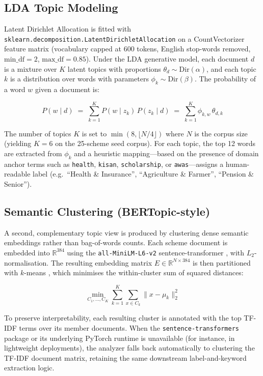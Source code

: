 \documentclass[10pt, journal, twocolumn]{IEEEtran}
\begin{document}
\subsection{LDA Topic Modeling}
Latent Dirichlet Allocation \cite{blei2003lda} is fitted with \texttt{sklearn.decomposition.LatentDirichletAllocation} on a CountVectorizer feature matrix (vocabulary capped at 600 tokens, English stop-words removed, $\text{min\_df}=2$, $\text{max\_df}=0.85$). Under the LDA generative model, each document $d$ is a mixture over $K$ latent topics with proportions $\theta_d \sim \text{Dir}(\alpha)$, and each topic $k$ is a distribution over words with parameters $\phi_k \sim \text{Dir}(\beta)$. The probability of a word $w$ given a document is:

\begin{equation}
    P(w \mid d) \;=\; \sum_{k=1}^{K} P(w \mid z_k)\, P(z_k \mid d) \;=\; \sum_{k=1}^{K} \phi_{k,w}\, \theta_{d,k}
\end{equation}

The number of topics $K$ is set to $\min(8, \lfloor N/4 \rfloor)$ where $N$ is the corpus size (yielding $K=6$ on the 25-scheme seed corpus). For each topic, the top 12 words are extracted from $\phi_k$ and a heuristic mapping---based on the presence of domain anchor terms such as \texttt{health}, \texttt{kisan}, \texttt{scholarship}, or \texttt{awas}---assigns a human-readable label (e.g.\ ``Health \& Insurance'', ``Agriculture \& Farmer'', ``Pension \& Senior'').

\subsection{Semantic Clustering (BERTopic-style)}
A second, complementary topic view is produced by clustering dense semantic embeddings rather than bag-of-words counts. Each scheme document is embedded into $\mathbb{R}^{384}$ using the \texttt{all-MiniLM-L6-v2} sentence-transformer \cite{reimers2019sbert}, with $L_2$-normalisation. The resulting embedding matrix $E \in \mathbb{R}^{N \times 384}$ is then partitioned with $k$-means \cite{macqueen1967kmeans}, which minimises the within-cluster sum of squared distances:

\begin{equation}
    \min_{C_1, \dots, C_K} \sum_{k=1}^{K} \sum_{x \in C_k} \| x - \mu_k \|_{2}^{2}
\end{equation}

To preserve interpretability, each resulting cluster is annotated with the top TF-IDF terms over its member documents. When the \texttt{sentence-transformers} package or its underlying PyTorch runtime is unavailable (for instance, in lightweight deployments), the analyzer falls back automatically to clustering the TF-IDF document matrix, retaining the same downstream label-and-keyword extraction logic.
\end{document}
